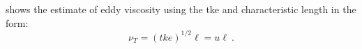 \documentclass[11pt]{article}
\begin{document}
\begin{enumerate}

	 shows the estimate of eddy viscosity using the tke and characteristic length in the form:
	\begin{equation}
		\nu_T = \left( tke \right)^{1/2} \ell = u \ell\:.
	\end{equation}


\end{enumerate}
\end{document}
